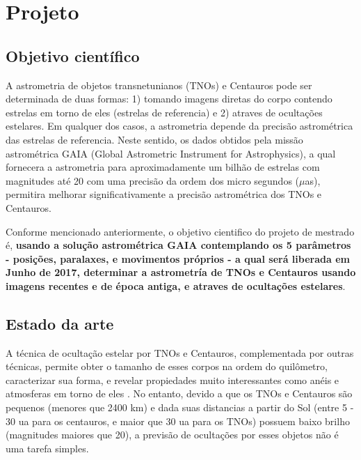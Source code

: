 \documentclass[a4paper, 11pt]{article}
\begin{document}
\renewcommand{\figurename}{\textsc{Figura}}
\renewcommand{\tablename}{\textsc{Tabela}}
\renewcommand{\refname}{Refer\^encias}




\section{Projeto}

\subsection{Objetivo científico}

A astrometria de objetos transnetunianos (TNOs) e Centauros pode ser determinada de duas formas: 1) tomando imagens diretas do corpo contendo estrelas em torno de eles (estrelas de referencia) e 2) atraves de ocultações estelares. Em qualquer dos casos, a astrometria depende da precisão astrométrica das estrelas de referencia. Neste sentido, os dados obtidos pela missão astrométrica GAIA (Global Astrometric Instrument for Astrophysics), a qual fornecera a astrometria para aproximadamente um bilhão de estrelas com magnitudes até 20 com uma precisão da ordem dos micro segundos ($\mu$as), permitira melhorar significativamente a precisão astrométrica dos TNOs e Centauros.

Conforme mencionado anteriormente, o objetivo cientifico do projeto de mestrado é, \textbf{usando a solução astrométrica GAIA contemplando os 5 parâmetros - posições, paralaxes, e movimentos próprios - a qual será liberada em Junho de 2017, determinar a astrometría de TNOs e Centauros usando imagens recentes e de época antiga, e atraves de ocultações estelares}.

\subsection{Estado da arte}

A técnica de ocultação estelar por TNOs e Centauros, complementada por outras técnicas, permite obter o tamanho de esses corpos na ordem do quilômetro, caracterizar sua forma, e revelar propiedades muito interessantes como anéis \citep{2017Natur.550..219O, 2014AGUFM.P43F..01B} e atmosferas em torno de eles \citep{1538-3881-136-5-1757, 2006Natur.439...52S}. No entanto, devido a que os TNOs e Centauros são pequenos (menores que 2400 km) e dada suas distancias a partir do Sol (entre  5 - 30 ua para os centauros, e maior que 30 ua para os TNOs) possuem baixo brilho (magnitudes maiores que 20), a previsão de ocultações por esses objetos não é uma tarefa simples. 
\end{document}
